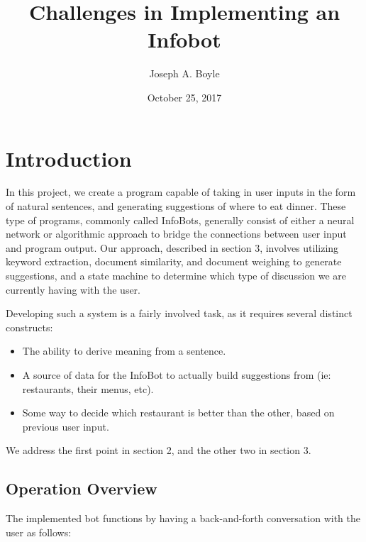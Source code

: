 \documentclass{article}
\title{Challenges in Implementing an Infobot}
\author{Joseph A. Boyle}
\date{October 25, 2017}
\begin{document}
\maketitle

\section{Introduction}
    In this project, we create a program capable of taking in user inputs in the form of natural sentences, and generating suggestions of where to eat dinner. These type of programs, commonly called InfoBots, generally consist of either a neural network or algorithmic approach to bridge the connections between user input and program output. Our approach, described in section 3, involves utilizing keyword extraction, document similarity, and document weighing to generate suggestions, and a state machine to determine which type of discussion we are currently having with the user.
    
    Developing such a system is a fairly involved task, as it requires several distinct constructs:
    
    \begin{itemize}
        \item The ability to derive meaning from a sentence.
        \item A source of data for the InfoBot to actually build suggestions from (ie: restaurants, their menus, etc).
        \item Some way to decide which restaurant is better than the other, based on previous user input.
    \end{itemize}
    
    We address the first point in section 2, and the other two in section 3.
    
    \subsection{Operation Overview}
    The implemented bot functions by having a back-and-forth conversation with the user as follows:
    
\end{document}
